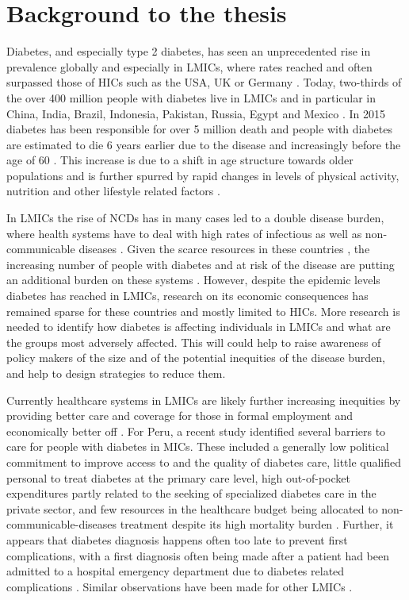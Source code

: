 
\section{Background to the thesis}

Diabetes, and especially type 2 diabetes, has seen an unprecedented rise in prevalence globally and especially in \acp{LMIC}, where rates reached and often surpassed those of \acp{HIC} such as the USA, UK or Germany \parencite{Risk2016,Hu2011}. Today, two-thirds of the over 400 million people with diabetes live in \acp{LMIC} \parencite{InternationalDiabetesFederation2013} and in particular in China, India, Brazil, Indonesia, Pakistan, Russia, Egypt and Mexico \parencite{Risk2016}. In 2015 diabetes has been responsible for over 5 million death and people with diabetes are estimated to die 6 years earlier due to the disease and increasingly before the age of 60 \parencite{InternationalDiabetesFederation2015,Seshasai2011}. This increase is due to a shift in age structure towards older populations and is further spurred by rapid changes in levels of physical activity, nutrition and other lifestyle related factors \parencite{Risk2016,Hu2011}.

In \acp{LMIC} the rise of \acp{NCD} has in many cases led to a double disease burden, where health systems have to deal with high rates of infectious as well as non-communicable diseases \parencite{Jamison2013}. Given the scarce resources in these countries \parencite{Mills2014}, the increasing number of people with diabetes and at risk of the disease are putting an additional burden on these systems \parencite{Wareham2016,Chan2016}. However, despite the epidemic levels diabetes has reached in \acp{LMIC}, research on its economic consequences has remained sparse for these countries and mostly limited to \acp{HIC}. More research is needed to identify how diabetes is affecting individuals in \acp{LMIC} and what are the groups most adversely affected. This will could help to raise awareness of policy makers of the size and of the potential inequities of the disease burden, and help to design strategies to reduce them.

Currently healthcare systems in \acp{LMIC} are likely further increasing inequities by providing better care and coverage for those in formal employment and economically better off \parencite{Mills2014,DiCesare2013}. For Peru, a recent study identified several barriers to care for people with diabetes in \acp{MIC}. These included a generally low political commitment to improve access to and the quality of diabetes care, little qualified personal to treat diabetes at the primary care level, high out-of-pocket expenditures partly related to the seeking of specialized diabetes care in the private sector, and few resources in the healthcare budget being allocated to non-communicable-diseases treatment despite its high mortality burden \parencite{Cardenas2016}. Further, it appears that diabetes diagnosis happens often too late to prevent first complications, with a first diagnosis often being made after a patient had been admitted to a hospital emergency department due to diabetes related complications \parencite{Cardenas2016}. Similar observations have been made for other \acp{LMIC} \parencite{Beran2015,WHO2014}.

